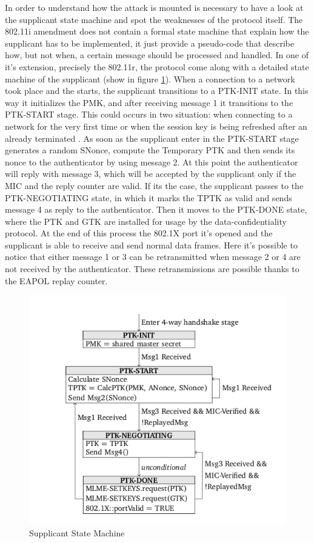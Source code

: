 In order to understand how the attack is mounted is necessary to have a look at the supplicant state machine and spot the weaknesses of the protocol itself.
The 802.11i amendment does not contain a formal state machine that explain how the supplicant has to be implemented, it just provide a pseudo-code that describe
how, but not when, a certain message should be processed and handled. In one of it's extension, precisely the 802.11r, the \fwh protocol come along with 
a detailed state machine of the supplicant (show in figure \ref{fig:sup-sm}).
When a connection to a network took place and the \fwh starts, the supplicant transitions to a PTK-INIT state. In this way it initializes the PMK, and 
after receiving message 1 it transitions to the PTK-START stage. This could occurs in two situation: when connecting to a network for the very first time or when the
session key is being refreshed after an already terminated \fwh. As soon as the supplicant enter in the PTK-START stage generates a random SNonce, compute the 
Temporary PTK and then sends its nonce to the authenticator by using message 2. At this point the authenticator will reply with message 3, which will be accepted by the supplicant
only if the MIC and the reply counter are valid. If its the case, the supplicant passes to the PTK-NEGOTIATING state, in which it marks the TPTK as valid and sends message 4 as reply to 
the authenticator. Then it moves to the PTK-DONE state, where the PTK and GTK are installed for usage by the data-confidentiality protocol. At the end of this process
the 802.1X port it's opened and the supplicant is able to receive and send normal data frames. Here it's possible to notice that either message 1 or 3 can be retransmitted 
when message 2 or 4 are not received by the authenticator. These retransmissions are possible thanks to the EAPOL replay counter.


\begin{figure}[tbh]
  \centering
  \includegraphics[width=0.8\linewidth]{images/sup-sm.png}
  \caption[Supplicant State Machine]{Supplicant State Machine}
  \label{fig:sup-sm}
\end{figure}

